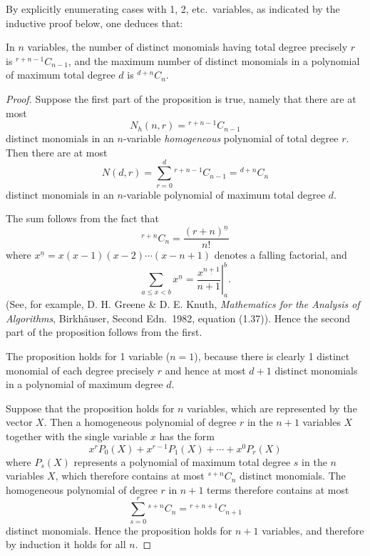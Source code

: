By explicitly enumerating cases with 1, 2, etc.\ variables, as
indicated by the inductive proof below, one deduces that:

\begin{prop}
  In $n$ variables, the number of distinct monomials having total
  degree precisely $r$ is $^{r+n-1}C_{n-1}$, and the maximum number of
  distinct monomials in a polynomial of maximum total degree $d$ is
  $^{d+n}C_n$.
\end{prop}

\begin{proof}
  Suppose the first part of the proposition is true, namely that there
  are at most
  \[
    N_h(n,r) = {}^{r+n-1}C_{n-1}
  \]
  distinct monomials in an $n$-variable {\em homogeneous\/}
  polynomial of total degree $r$.  Then there are at most
  \[
    N(d,r) = \sum_{r=0}^d {}^{r+n-1}C_{n-1} = {}^{d+n}C_n
  \]
  distinct monomials in an $n$-variable polynomial of maximum total
  degree $d$.

  The sum follows from the fact that
  \[
    {}^{r+n}C_n = \frac{(r+n)^{\underline n}}{n!}
  \]
  where $x^{\underline n} = x(x-1)(x-2)\cdots(x-n+1)$ denotes a
  falling factorial, and
  \[
    \sum_{a \leq x < b} x^{\underline n} =
    \left. \frac{x^{\underline{n+1}}}{n+1} \right|_a^b.
  \]
  (See, for example, D. H. Greene \& D. E. Knuth, {\it Mathematics
  for the Analysis of Algorithms}, Birkh\"auser, Second Edn.\ 1982,
  equation (1.37)).  Hence the second part of the proposition follows
  from the first.

  The proposition holds for 1 variable ($n = 1$), because there is
  clearly 1 distinct monomial of each degree precisely $r$ and hence
  at most $d+1$ distinct monomials in a polynomial of maximum degree
  $d$.

  Suppose that the proposition holds for $n$ variables, which are
  represented by the vector $X$.  Then a homogeneous polynomial of
  degree $r$ in the $n+1$ variables $X$ together with the single
  variable $x$ has the form
  \[
    x^r P_0(X) + x^{r-1} P_1(X) + \cdots + x^0 P_r(X)
  \]
  where $P_s(X)$ represents a polynomial of maximum total degree $s$
  in the $n$ variables $X$, which therefore contains at most
  $^{s+n}C_n$ distinct monomials.  The homogeneous polynomial of
  degree $r$ in $n+1$ terms therefore contains at most
  \[
    \sum_{s=0}^r {}^{s+n}C_n = {}^{r+n+1}C_{n+1}
  \]
  distinct monomials.
  Hence the proposition holds for $n+1$ variables, and therefore by
  induction it holds for all $n$.
\end{proof}



